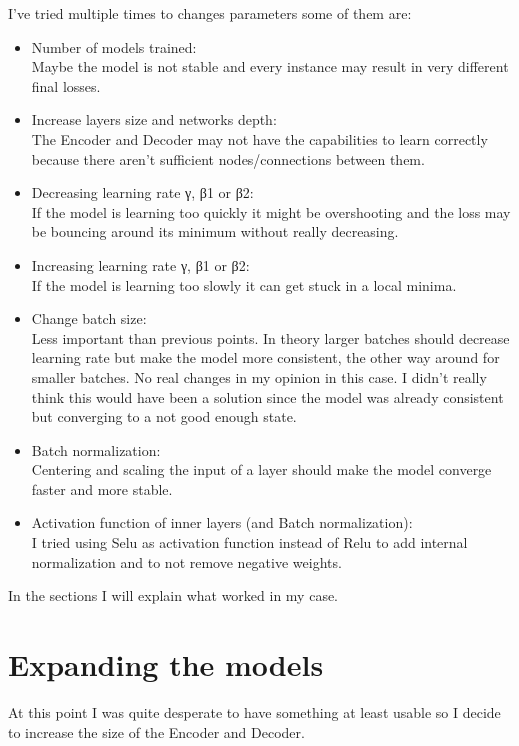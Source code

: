 \documentclass[
  letterpaper,
  DIV=11,
  numbers=noendperiod]{scrreprt}
\providecommand{\tightlist}{%
  \setlength{\itemsep}{0pt}\setlength{\parskip}{0pt}}\usepackage{longtable,booktabs,array}
\begin{document}
I've tried multiple times to changes parameters some of them are:

\begin{itemize}
\tightlist
\item
  Number of models trained:\\
  Maybe the model is not stable and every instance may result in very
  different final losses.
\item
  Increase layers size and networks depth:\\
  The Encoder and Decoder may not have the capabilities to learn
  correctly because there aren't sufficient nodes/connections between
  them.
\item
  Decreasing learning rate γ, β1 or β2:\\
  If the model is learning too quickly it might be overshooting and the
  loss may be bouncing around its minimum without really decreasing.
\item
  Increasing learning rate γ, β1 or β2:\\
  If the model is learning too slowly it can get stuck in a local
  minima.
\item
  Change batch size:\\
  Less important than previous points. In theory larger batches should
  decrease learning rate but make the model more consistent, the other
  way around for smaller batches. No real changes in my opinion in this
  case. I didn't really think this would have been a solution since the
  model was already consistent but converging to a not good enough
  state.
\item
  Batch normalization:\\
  Centering and scaling the input of a layer should make the model
  converge faster and more stable.
\item
  Activation function of inner layers (and Batch normalization):\\
  I tried using Selu as activation function instead of Relu to add
  internal normalization and to not remove negative weights.
\end{itemize}

In the sections I will explain what worked in my case.

\hypertarget{expanding-the-models}{%
\chapter{Expanding the models}\label{expanding-the-models}}

At this point I was quite desperate to have something at least usable so
I decide to increase the size of the Encoder and Decoder.
\end{document}
